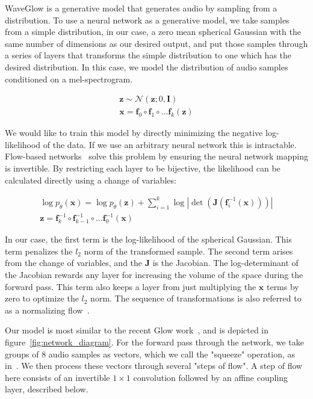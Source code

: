 WaveGlow is a generative model that generates audio by sampling from a distribution. To use a neural network as a generative model, we take samples from a simple distribution, in our case, a zero mean spherical Gaussian with the same number of dimensions as our desired output, and put those samples through a series of layers that transforms the simple distribution to one which has the desired distribution. In this case, we model the distribution of audio samples conditioned on a mel-spectrogram. 

\begin{gather}
\boldsymbol{z} \sim \mathcal{N}(\boldsymbol{z};0,\boldsymbol{I}) \\
\boldsymbol{x} = \boldsymbol{f}_0 \circ \boldsymbol{f}_1 \circ \ldots \boldsymbol{f}_k(\boldsymbol{z})
\end{gather}

We would like to train this model by directly minimizing the negative log-likelihood of the data. If we use an arbitrary neural network this is intractable.  Flow-based networks~\cite{dinh2014nice,dinh2016density,kingma2018glow} solve this problem by ensuring the neural network mapping is invertible.  By restricting each layer to be bijective, the likelihood can be calculated directly using a change of variables:

\begin{gather}
\log{p_\theta(\boldsymbol{x})} = \log{p_\theta(\boldsymbol{z})} + \sum_{i=1}^{k} \log
|\det(\boldsymbol{J}(\boldsymbol{f}_i^{-1}(\boldsymbol{x})))| \\
\boldsymbol{z} = \boldsymbol{f}_k^{-1} \circ \boldsymbol{f}_{k-1}^{-1} \circ \ldots \boldsymbol{f}_0^{-1}(\boldsymbol{x})
\end{gather}

In our case, the first term is the log-likelihood of the spherical Gaussian.  This term penalizes the $l_2$ norm of the transformed sample.  The second term arises from the change of variables, and the $\boldsymbol{J}$ is the Jacobian. The log-determinant of the Jacobian rewards any layer for increasing the volume of the space during the forward pass.  This term also keeps a layer from just multiplying the $\boldsymbol{x}$ terms by zero to optimize the $l_2$ norm.  The sequence of transformations is also referred to as a normalizing flow~\cite{rezende2015variational}.

Our model is most similar to the recent Glow work~\cite{kingma2018glow}, and is depicted in figure~\ref{fig:network_diagram}. For the forward pass through the network, we take groups of 8 audio samples as vectors, which we call the "squeeze" operation, as in~\cite{kingma2018glow}. We then process these vectors through several "steps of flow". A step of flow here consists of an invertible $1\times 1$ convolution followed by an affine coupling layer, described below.


